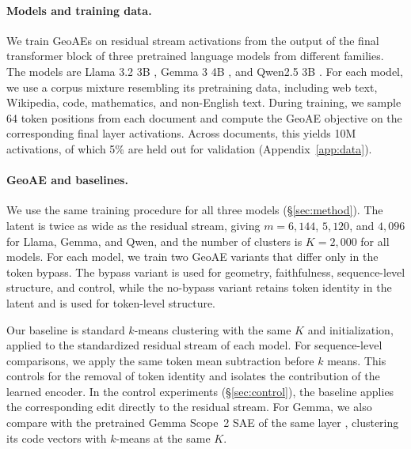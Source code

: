 \documentclass[11pt]{article}
\begin{document}
\paragraph{Models and training data.}
We train GeoAEs on residual stream activations from the output of the final transformer block of three pretrained language models from different families. The models are Llama 3.2 3B \citep{meta2024llama}, Gemma 3 4B \citep{gemma2025gemma}, and Qwen2.5 3B \citep{qwen2024qwen2}. For each model, we use a corpus mixture resembling its pretraining data, including web text, Wikipedia, code, mathematics, and non-English text. During training, we sample 64 token positions from each document and compute the GeoAE objective on the corresponding final layer activations. Across documents, this yields 10M activations, of which 5\% are held out for validation (Appendix~\ref{app:data}).

\paragraph{GeoAE and baselines.}


We use the same training procedure for all three models (\S\ref{sec:method}).
The latent is twice as wide as the residual stream, giving $m = 6{,}144$, $5{,}120$, and $4{,}096$ for Llama, Gemma, and Qwen, and the number of clusters is $K = 2{,}000$ for all models. For each model, we train two GeoAE variants that differ only in the token bypass. The bypass variant is used for geometry, faithfulness, sequence-level structure, and control, while the no-bypass variant retains token identity in the latent and is used for token-level structure.


Our baseline is standard $k$-means clustering \citep{lloyd1982least} with the same $K$ and initialization, applied to the standardized residual stream of each model. For sequence-level comparisons, we apply the same token mean subtraction before $k$ means. This controls for the removal of token identity and isolates the contribution of the learned encoder. In the control experiments (\S\ref{sec:control}), the baseline applies the corresponding edit directly to the residual stream. For Gemma, we also compare with the pretrained Gemma Scope~2 SAE of the same layer \citep[16k JumpReLU features;][]{mcdougall2025gemma}, clustering its code vectors with $k$-means at the same $K$.
\end{document}
